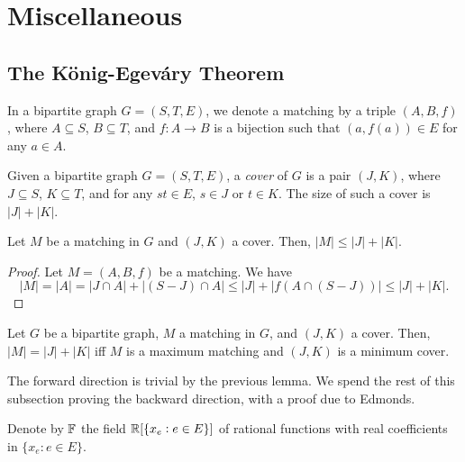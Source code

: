 
\clearpage
\section{Miscellaneous}

\subsection{The K\"{o}nig-Egev\'{a}ry Theorem}

In a bipartite graph $G = (S,T,E)$, we denote a matching by a triple $(A,B,f)$, where $A\subseteq S$, $B\subseteq T$, and $f:A\to B$ is a bijection such that $(a,f(a)) \in E$ for any $a \in A$.

\begin{fdef}
	Given a bipartite graph $G=(S,T,E)$, a \emph{cover} of $G$ is a pair $(J,K)$, where $J \subseteq S$, $K \subseteq T$, and for any $st \in E$, $s \in J$ or $t \in K$. The size of such a cover is $|J|+|K|$.
\end{fdef}

\begin{flem}
	Let $M$ be a matching in $G$ and $(J,K)$ a cover. Then, $|M| \le |J|+|K|$.
\end{flem}
\begin{proof}
	Let $M = (A,B,f)$ be a matching. We have
	\[ |M| = |A| = |J \cap A| + |(S-J)\cap A| \le |J| + |f(A \cap (S-J))| \le |J|+|K|. \]
\end{proof}

\begin{ftheo}[K\"{o}nig]
	Let $G$ be a bipartite graph, $M$ a matching in $G$, and $(J,K)$ a cover. Then, $|M|=|J|+|K|$ iff $M$ is a maximum matching and $(J,K)$ is a minimum cover. 
\end{ftheo}
The forward direction is trivial by the previous lemma. We spend the rest of this subsection proving the backward direction, with a proof due to Edmonds.

Denote by $\mathbb{F}$ the field $\mathbb{R}[\{x_e : e \in E\}]$ of rational functions with real coefficients in $\{x_e : e \in E\}$.


